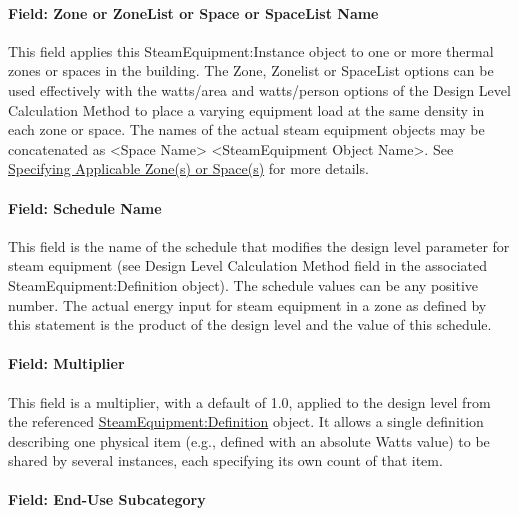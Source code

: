 \paragraph{Field: Zone or ZoneList or Space or SpaceList Name}\label{steameq-field-zone-or-zonelist-name-000-steam-instance}

This field applies this SteamEquipment:Instance object to one or more thermal zones or spaces in the building. The Zone, Zonelist or SpaceList options can be used effectively with the watts/area and watts/person options of the Design Level Calculation Method to place a varying equipment load at the same density in each zone or space. The names of the actual steam equipment objects may be concatenated as \textless{}Space Name\textgreater{} \textless{}SteamEquipment Object Name\textgreater{}. See \hyperref[specifying-applicable-zones-or-spaces]{Specifying Applicable Zone(s) or Space(s)} for more details.

\paragraph{Field: Schedule Name}\label{field-schedule-name-4-000-steam-instance}

This field is the name of the schedule that modifies the design level parameter for steam equipment (see Design Level Calculation Method field in the associated SteamEquipment:Definition object). The schedule values can be any positive number. The actual energy input for steam equipment in a zone as defined by this statement is the product of the design level and the value of this schedule.

\paragraph{Field: Multiplier}\label{field-multiplier-steamequipmentinstance}

This field is a multiplier, with a default of 1.0, applied to the design level from the referenced \hyperref[steamequipmentdefinition]{SteamEquipment:Definition} object. It allows a single definition describing one physical item (e.g., defined with an absolute Watts value) to be shared by several instances, each specifying its own count of that item.

\paragraph{Field: End-Use Subcategory}\label{field-end-use-subcategory-4-000-steam-instance}

